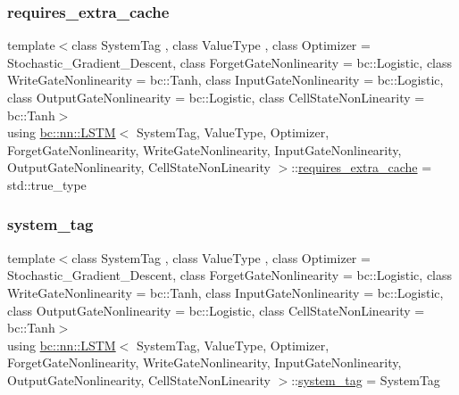 \mbox{\label{structbc_1_1nn_1_1LSTM_af443096fc604c2d9e06122298b9b0c8b}} 
\subsubsection{\texorpdfstring{requires\+\_\+extra\+\_\+cache}{requires\_extra\_cache}}
{\footnotesize\ttfamily template$<$class System\+Tag , class Value\+Type , class Optimizer  = Stochastic\+\_\+\+Gradient\+\_\+\+Descent, class Forget\+Gate\+Nonlinearity  = bc\+::\+Logistic, class Write\+Gate\+Nonlinearity  = bc\+::\+Tanh, class Input\+Gate\+Nonlinearity  = bc\+::\+Logistic, class Output\+Gate\+Nonlinearity  = bc\+::\+Logistic, class Cell\+State\+Non\+Linearity  = bc\+::\+Tanh$>$ \\
using \hyperlink{structbc_1_1nn_1_1LSTM}{bc\+::nn\+::\+L\+S\+TM}$<$ System\+Tag, Value\+Type, Optimizer, Forget\+Gate\+Nonlinearity, Write\+Gate\+Nonlinearity, Input\+Gate\+Nonlinearity, Output\+Gate\+Nonlinearity, Cell\+State\+Non\+Linearity $>$\+::\hyperlink{structbc_1_1nn_1_1LSTM_af443096fc604c2d9e06122298b9b0c8b}{requires\+\_\+extra\+\_\+cache} =  std\+::true\+\_\+type}

\mbox{\label{structbc_1_1nn_1_1LSTM_a6a485b17d877d63d1fad2698584eb478}} 
\subsubsection{\texorpdfstring{system\+\_\+tag}{system\_tag}}
{\footnotesize\ttfamily template$<$class System\+Tag , class Value\+Type , class Optimizer  = Stochastic\+\_\+\+Gradient\+\_\+\+Descent, class Forget\+Gate\+Nonlinearity  = bc\+::\+Logistic, class Write\+Gate\+Nonlinearity  = bc\+::\+Tanh, class Input\+Gate\+Nonlinearity  = bc\+::\+Logistic, class Output\+Gate\+Nonlinearity  = bc\+::\+Logistic, class Cell\+State\+Non\+Linearity  = bc\+::\+Tanh$>$ \\
using \hyperlink{structbc_1_1nn_1_1LSTM}{bc\+::nn\+::\+L\+S\+TM}$<$ System\+Tag, Value\+Type, Optimizer, Forget\+Gate\+Nonlinearity, Write\+Gate\+Nonlinearity, Input\+Gate\+Nonlinearity, Output\+Gate\+Nonlinearity, Cell\+State\+Non\+Linearity $>$\+::\hyperlink{structbc_1_1nn_1_1LSTM_a6a485b17d877d63d1fad2698584eb478}{system\+\_\+tag} =  System\+Tag}

